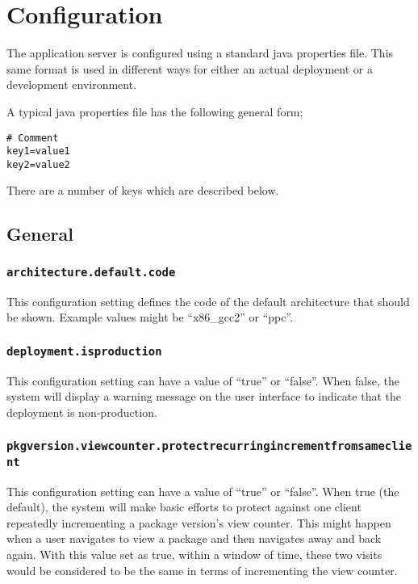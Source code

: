 
\section{Configuration}
\label{config}

The application server is configured using a standard java properties file.  This same format is used in different ways for either an actual deployment or a development environment.

A typical java properties file has the following general form;

\begin{verbatim}
# Comment
key1=value1
key2=value2
\end{verbatim}

There are a number of keys which are described below.

\subsection{General}

\subsubsection{\tt architecture.default.code}

This configuration setting defines the code of the default architecture that should be shown.  Example values might be ``x86\_gcc2'' or ``ppc''.

\subsubsection{\tt deployment.isproduction}

This configuration setting can have a value of ``true'' or ``false''.  When false, the system will display a warning message on the user interface to indicate that the deployment is non-production.

\subsubsection{\tt pkgversion.viewcounter.protectrecurringincrementfromsameclient}

This configuration setting can have a value of ``true'' or ``false''.  When true (the default), the system will make basic efforts to protect against one client repeatedly incrementing a package version's view counter.  This might happen when a user navigates to view a package and then navigates away and back again.  With this value set as true, within a window of time, these two visits would be considered to be the same in terms of incrementing the view counter.


